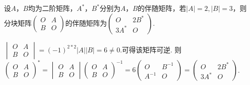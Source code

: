 \begin{example}
	设$A$，$B$均为二阶矩阵，$A^*$，$B^*$分别为$A$，$B$的伴随矩阵，若$|A|=2,|B|=3$，则分块矩阵$\begin{pmatrix}
		O & A \\
		B & O
	\end{pmatrix}$的伴随矩阵为$\begin{pmatrix}
		O    & 2B^* \\
		3A^* & O
	\end{pmatrix}$.
\end{example}

\begin{solution}
	$\begin{vmatrix}
		O & A \\
		B & O
	\end{vmatrix}=(-1)^{2*2}|A||B|=6\neq0$.可得该矩阵可逆.
则$\begin{pmatrix}
		O & A \\
		B & O
	\end{pmatrix}^*=\begin{vmatrix}
		O & A \\
		B & O
	\end{vmatrix}\begin{pmatrix}
		O & A \\
		B & O
	\end{pmatrix}^{-1}=6\begin{pmatrix}
		O      & B^{-1} \\
		A^{-1} & O
	\end{pmatrix}=\begin{pmatrix}
		O    & 2B^* \\
		3A^* & O
	\end{pmatrix}$.
\end{solution}
